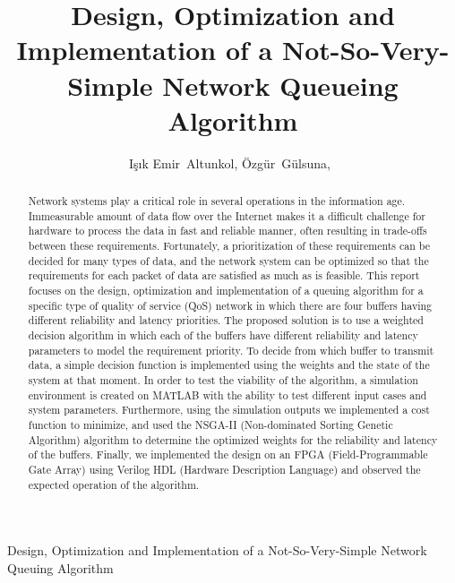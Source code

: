 \documentclass[journal,twoside]{IEEEtran}
\begin{document}
\title{Design, Optimization and Implementation of a Not-So-Very-Simple Network Queueing Algorithm}


\author{Işık Emir~Altunkol, Özgür~Gülsuna,~}

{Design, Optimization and Implementation of a Not-So-Very-Simple Network Queuing Algorithm}
% 

\maketitle

\begin{abstract}
Network systems play a critical role in several operations in the information age. Immeasurable amount of data flow over the Internet makes it a difficult challenge for hardware to process the data in fast and reliable manner, often resulting in trade-offs between these requirements. Fortunately, a prioritization of these requirements can be decided for many types of data, and the network system can be optimized so that the requirements for each packet of data are satisfied as much as is feasible. This report focuses on the design, optimization and implementation of a queuing algorithm for a specific type of quality of service (QoS) network in which there are four buffers having different reliability and latency priorities. The proposed solution is to use a weighted decision algorithm in which each of the buffers have different reliability and latency parameters to model the requirement priority. To decide from which buffer to transmit data, a simple decision function is implemented using the weights and the state of the system at that moment. In order to test the viability of the algorithm, a simulation environment is created on MATLAB with the ability to test different input cases and system parameters. Furthermore, using the simulation outputs we implemented a cost function to minimize, and used the NSGA-II (Non-dominated Sorting Genetic Algorithm) algorithm to determine the optimized weights for the reliability and latency of the buffers. Finally, we implemented the design on an FPGA (Field-Programmable Gate Array) using Verilog HDL (Hardware Description Language) and observed the expected operation of the algorithm.
\end{abstract}
\end{document}
